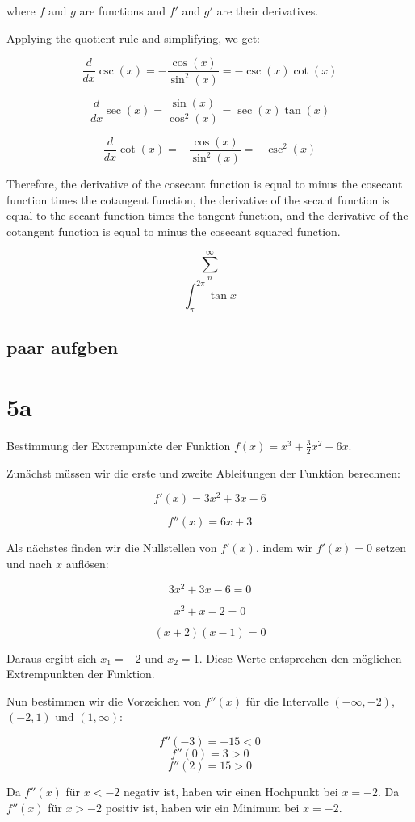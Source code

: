 \documentclass{report}
\begin{document}
where $f$ and $g$ are functions and $f'$ and $g'$ are their derivatives.

Applying the quotient rule and simplifying, we get:

$$\frac{d}{dx} \csc(x) = -\frac{\cos(x)}{\sin^2(x)} = -\csc(x) \cot(x)$$

$$\frac{d}{dx} \sec(x) = \frac{\sin(x)}{\cos^2(x)} = \sec(x) \tan(x)$$

$$\frac{d}{dx} \cot(x) = -\frac{\cos(x)}{\sin^2(x)} = -\csc^2(x)$$

Therefore, the derivative of the cosecant function is equal to minus the
cosecant function times the cotangent function, the derivative of the secant
function is equal to the secant function times the tangent function, and the
derivative of the cotangent function is equal to minus the cosecant squared
function.

$$\displaystyle\sum_{n}^{\infty}$$
\[\displaystyle\int_{\pi}^{2\pi}\tan x\]

\subsection{paar aufgben}
\section{5a}
Bestimmung der Extrempunkte der Funktion $f(x) = x^3 + \frac{3}{2}x^2 - 6x$.

Zunächst müssen wir die erste und zweite Ableitungen der Funktion berechnen:

$$f'(x) = 3x^2 + 3x - 6$$

$$f''(x) = 6x + 3$$

Als nächstes finden wir die Nullstellen von $f'(x)$, indem wir $f'(x) = 0$ setzen und nach $x$ auflösen:

$$3x^2 + 3x - 6 = 0$$

$$x^2 + x - 2 = 0$$

$$(x+2)(x-1) = 0$$

Daraus ergibt sich $x_1=-2$ und $x_2=1$. Diese Werte entsprechen den möglichen Extrempunkten der Funktion.

Nun bestimmen wir die Vorzeichen von $f''(x)$ für die Intervalle $(-\infty,-2)$, $(-2,1)$ und $(1,\infty)$:

$$f''(-3) = -15 < 0$$
$$f''(0) = 3 > 0$$
$$f''(2) = 15 > 0$$

Da $f''(x)$ für $x<-2$ negativ ist, haben wir einen Hochpunkt bei $x=-2$. Da $f''(x)$ für $x>-2$ positiv ist, haben wir ein Minimum bei $x=-2$.
\end{document}
